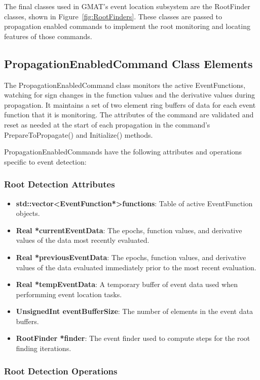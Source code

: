 \documentclass[letterpaper,10pt]{article}
\begin{document}
The final classes used in GMAT's event location subsystem are the RootFinder
classes, shown in Figure~\ref{fig:RootFinders}.  These classes are passed to
propagation enabled commands to implement the root monitoring and locating
features of those commands.

\subsection{PropagationEnabledCommand Class Elements}

The PropagationEnabledCommand class monitors the active EventFunctions, watching
for sign changes in the function values and the derivative values during
propagation.  It maintains a set of two element ring buffers of data for each
event function that it is monitoring.  The attributes of the command are
validated and reset as needed at the start of each propagation in the 
command's PrepareToPropagate() and Initialize() methods. 

PropagationEnabledCommands have the following attributes and operations
specific to event detection:

\subsubsection{Root Detection Attributes}

\begin{itemize}
\item \textbf{std::vector\textless{EventFunction*}\textgreater functions}: Table
of active EventFunction objects.  
\item \textbf{Real *currentEventData}: The epochs, function values, and
derivative values of the data most recently evaluated.
\item \textbf{Real *previousEventData}: The epochs, function values, and
derivative values of the data evaluated immediately prior to the most recent
evaluation.
\item \textbf{Real *tempEventData}: A temporary buffer of event data used when
performming event location tasks.
\item \textbf{UnsignedInt eventBufferSize}: The number of elements in the event
data buffers.
\item \textbf{RootFinder *finder}:  The event finder used to compute steps for
the root finding iterations.
\end{itemize}


\subsubsection{Root Detection Operations}
\end{document}
